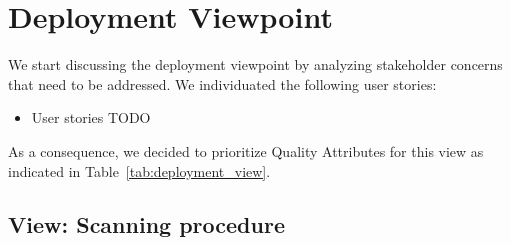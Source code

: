 

\section{Deployment Viewpoint}
We start discussing the deployment viewpoint by analyzing stakeholder concerns that need to be addressed.
We individuated the following user stories:
\begin{itemize}
    \item User stories TODO
\end{itemize}

As a consequence, we decided to prioritize Quality Attributes for this view as indicated in Table~\ref{tab:deployment_view}.
\begin{table}[h!]
    \centering
    \caption{Deployment View Prioritized Quality Attributes}
    \label{tab:deployment_view}
\end{table}

\subsection{View: Scanning procedure}

